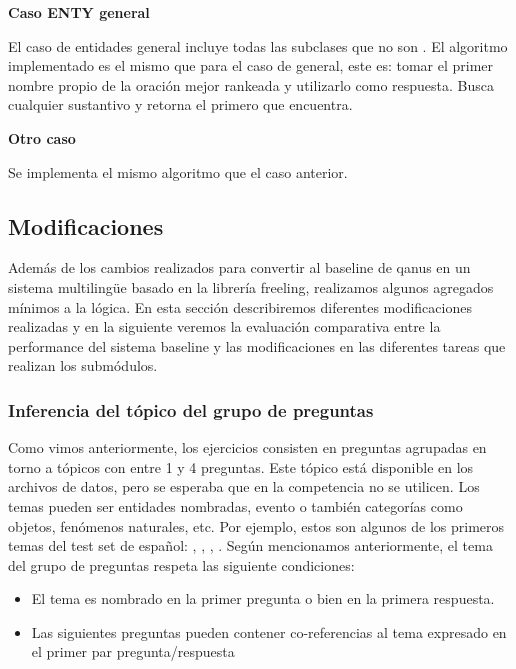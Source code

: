 \textbf{Caso ENTY general} \newline

El caso de entidades general incluye todas las subclases que no son . El algoritmo implementado es el mismo que para el caso de  general, este es: tomar el primer nombre propio de la oración mejor rankeada y utilizarlo como respuesta.
Busca cualquier sustantivo y retorna el primero que encuentra.  \newline

\textbf{Otro caso} \newline

Se implementa el mismo algoritmo que el caso anterior. \newline


\subsection{Modificaciones}
\label{subsec:modificaciones}

Además de los cambios realizados para convertir al baseline de qanus en un sistema multilingüe basado en la librería freeling, realizamos algunos agregados mínimos a la lógica. En esta sección describiremos diferentes modificaciones realizadas y en la siguiente veremos la evaluación comparativa entre la performance del sistema baseline y las modificaciones en las diferentes tareas que realizan los submódulos.

\subsubsection{Inferencia del tópico del grupo de preguntas}
\label{subsubsec:entidad-de-grupo}

Como vimos anteriormente, los ejercicios consisten en preguntas agrupadas en torno a tópicos con entre 1 y 4 preguntas. Este tópico está disponible en los archivos de datos, pero se esperaba que en la competencia no se utilicen. Los temas pueden ser entidades nombradas, evento o también categorías como objetos, fenómenos naturales, etc. Por ejemplo, estos son algunos de los primeros temas del test set de español: , , , . Según mencionamos anteriormente, el tema del grupo de preguntas respeta las siguiente condiciones:

\begin{itemize}
\item El tema es nombrado en la primer pregunta o bien en la primera respuesta.
\item Las siguientes preguntas pueden contener co-referencias al tema expresado en el primer par pregunta/respuesta
\end{itemize}

